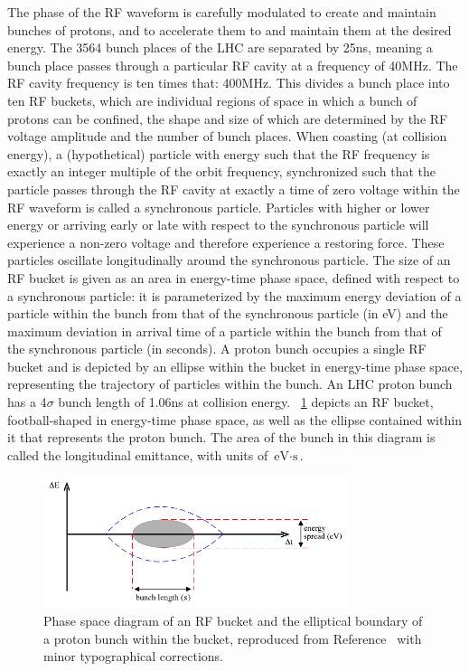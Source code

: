The phase of the RF waveform is carefully modulated to create and maintain bunches of protons, and to accelerate them to and maintain them at the desired energy.
The 3564 bunch places of the LHC are separated by 25\unit{ns}, meaning a bunch place passes through a particular RF cavity at a frequency of 40\unit{MHz}.
The RF cavity frequency is ten times that: 400\unit{MHz}.
This divides a bunch place into ten RF buckets, which are individual regions of space in which a bunch of protons can be confined, the shape and size of which are determined by the RF voltage amplitude and the number of bunch places.
When coasting (at collision energy), a (hypothetical) particle with energy such that the RF frequency is exactly an integer multiple of the orbit frequency, synchronized such that the particle passes through the RF cavity at exactly a time of zero voltage within the RF waveform is called a synchronous particle.
Particles with higher or lower energy or arriving early or late with respect to the synchronous particle will experience a non-zero voltage and therefore experience a restoring force.
These particles oscillate longitudinally around the synchronous particle.
The size of an RF bucket is given as an area in energy-time phase space, defined with respect to a synchronous particle: it is parameterized by the maximum energy deviation of a particle within the bunch from that of the synchronous particle (in \unit{eV}) and the maximum deviation in arrival time of a particle within the bunch from that of the synchronous particle (in seconds).
A proton bunch occupies a single RF bucket and is depicted by an ellipse within the bucket in energy-time phase space, representing the trajectory of particles within the bunch.
An LHC proton bunch has a 4$\sigma$ bunch length of 1.06\unit{ns} at collision energy.
\Fig~\ref{cms:rfbucket} depicts an RF bucket, football-shaped in energy-time phase space, as well as the ellipse contained within it that represents the proton bunch. The area of the bunch in this diagram is called the longitudinal emittance, with units of $\text{eV}\cdot\text{s}$.

\begin{figure}[p]
  \centering
  \includegraphics[width=0.8\textwidth]{figures/cms/RFBucket.pdf}
  \caption[Phase space diagram of an RF bucket and the elliptical boundary of a proton bunch within the bucket.]{Phase space diagram of an RF bucket and the elliptical boundary of a proton bunch within the bucket, reproduced from Reference~\cite{Baird:1017689} with minor typographical corrections.}
  \label{cms:rfbucket}
\end{figure}

